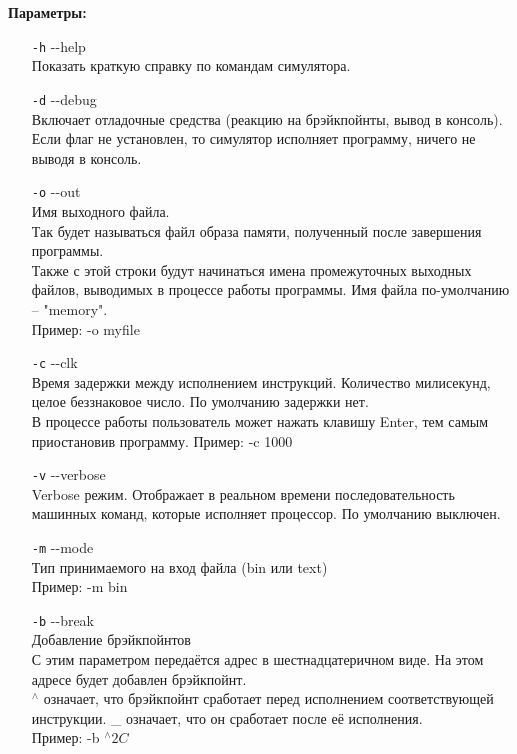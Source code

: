{\bf Параметры:}
\begin{enumerate}
	\item[{\tt -h}] {-}-help \\
	Показать краткую справку по командам симулятора.\\
	
	\item[{\tt -d}] {-}-debug \\
	Включает отладочные средства (реакцию на брэйкпойнты, вывод в консоль).
	Если флаг не  установлен, то симулятор исполняет программу, ничего не выводя в консоль.
	
	\item[{\tt -o}] {-}-out \\
	Имя выходного файла. \\ 
	Так будет называться файл образа памяти, полученный после завершения программы.\\
	Также с этой строки будут начинаться имена промежуточных выходных файлов, выводимых в процессе работы программы. Имя файла по-умолчанию -- "memory".\\
	Пример: -o myfile
	
	\item[{\tt -c}] {-}-clk \\
	Время задержки между исполнением инструкций. Количество милисекунд, целое беззнаковое число. По умолчанию задержки нет.\\
	В процессе работы пользователь может нажать клавишу Enter, тем самым приостановив программу.
	Пример: -c 1000
	
	\item[{\tt -v}] {-}-verbose \\
	Verbose режим. Отображает в реальном времени последовательность машинных команд, которые исполняет процессор. По умолчанию выключен.
	
	\item[{\tt -m}] {-}-mode \\
	Тип принимаемого на вход файла (bin или text) \\
	Пример: -m bin
	
	\item[{\tt -b}] {-}-break \\
	Добавление брэйкпойнтов \\
	С этим параметром передаётся адрес в шестнадцатеричном виде. На этом адресе будет добавлен брэйкпойнт. \\
	$^\wedge$ означает, что брэйкпойнт сработает перед исполнением соответствующей инструкции. \_ означает, что он сработает после её исполнения. \\
	Пример: -b $^\wedge2C$
	

\end{enumerate}
